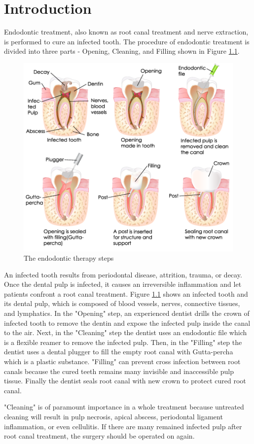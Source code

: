 \chapter{Introduction}
Endodontic treatment, also known as root canal treatment and nerve extraction, is performed to cure an infected tooth. The procedure of endodontic treatment is divided into three parts - Opening, Cleaning, and Filling shown in  Figure \ref{fig:endo-procedure}.
\begin{figure}[htbp]
\begin{center}
\includegraphics[width=0.8\linewidth]{Images/endo-procedure.png}
\end{center}
\caption{
The endodontic therapy steps
}\label{fig:endo-procedure}
\end{figure}
\newpage
An infected tooth results from periodontal disease, attrition, trauma, or decay. Once the dental pulp is infected, it causes an irreversible inflammation and let patients confront a root canal treatment. Figure \ref{fig:endo-procedure} shows an infected tooth and its dental pulp, which is composed of blood vessels, nerves, connective tissues, and lymphatics. In the "Opening" step, an experienced dentist drills the crown of infected tooth to remove the dentin and expose the infected pulp inside the canal to the air. Next, in the "Cleaning" step the dentist uses an endodontic file which is a flexible reamer to remove the infected pulp. Then, in the "Filling" step the dentist uses a dental plugger to fill the empty root canal with Gutta-percha which is a plastic substance. "Filling" can prevent cross infection between root canals because the cured teeth remains many invisible and inaccessible pulp tissue. Finally the dentist seals root canal with new crown to protect cured root canal. 
\par
"Cleaning" is of paramount importance in a whole treatment because untreated cleaning will result in pulp necrosis, apical abscess, periodontal ligament inflammation, or even cellulitis. If there are many remained infected pulp after root canal treatment, the surgery should be operated on again.
